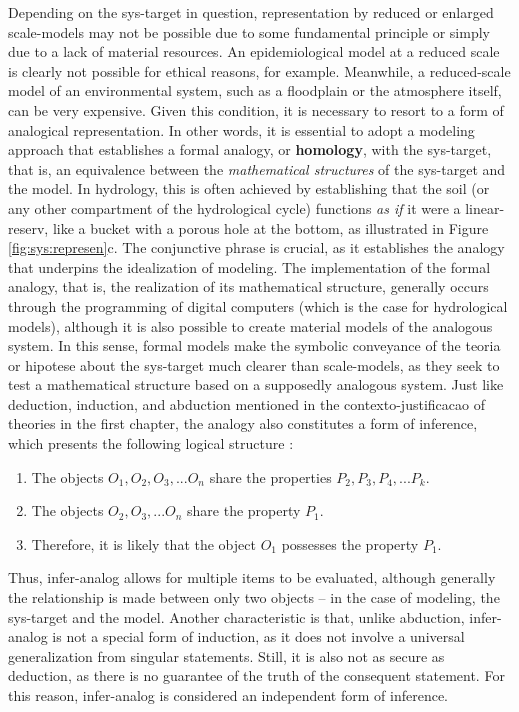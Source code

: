 \documentclass[./main_en.tex]{subfiles}
\begin{document}
\par Depending on the \gls{sys-target} in question, representation by reduced or enlarged \gls{scale-models} may not be possible due to some fundamental principle or simply due to a lack of material resources. An epidemiological \gls{model} at a reduced scale is clearly not possible for ethical reasons, for example. Meanwhile, a reduced-scale \gls{model} of an environmental \gls{system}, such as a floodplain or the atmosphere itself, can be very expensive. Given this condition, it is necessary to resort to a form of analogical representation. In other words, it is essential to adopt a modeling approach that establishes a formal \gls{analogy}, or \textbf{\gls{homology}}, with the \gls{sys-target}, that is, an equivalence between the \textit{mathematical structures} of the \gls{sys-target} and the \gls{model}. In \gls{hydrology}, this is often achieved by establishing that the soil (or any other compartment of the hydrological cycle) functions \textit{as if} it were a \gls{linear-reserv}, like a bucket with a porous hole at the bottom, as illustrated in Figure \ref{fig:sys:represen}c. The conjunctive phrase  is crucial, as it establishes the \gls{analogy} that underpins the \gls{idealization} of modeling. The implementation of the formal \gls{analogy}, that is, the realization of its mathematical structure, generally occurs through the programming of digital computers (which is the case for hydrological models), although it is also possible to create material models of the analogous \gls{system}. In this sense, formal models make the symbolic conveyance of the \gls{teoria} or \gls{hipotese} about the \gls{sys-target} much clearer than \gls{scale-models}, as they seek to test a mathematical structure based on a supposedly analogous \gls{system}. Just like deduction, induction, and abduction mentioned in the \gls{contexto-justificacao} of theories in the first chapter, the \gls{analogy} also constitutes a form of inference, which presents the following logical structure \cite{shaw_ashley_1983}:
\begin{enumerate}
    \item The objects $O_1, O_2, O_3, ... O_n$ share the properties $P_2, P_3, P_4, ... P_k$. 
    \item The objects $O_2, O_3, ... O_n$ share the property $P_1$. \\
    \item Therefore, it is likely that the object $O_1$ possesses the property $P_1$.
\end{enumerate}
Thus, \gls{infer-analog} allows for multiple items to be evaluated, although generally the relationship is made between only two objects – in the case of modeling, the \gls{sys-target} and the \gls{model}. Another characteristic is that, unlike abduction, \gls{infer-analog} is not a special form of induction, as it does not involve a universal generalization from singular statements. Still, it is also not as secure as deduction, as there is no guarantee of the truth of the consequent statement. For this reason, \gls{infer-analog} is considered an independent form of inference.
\end{document}
